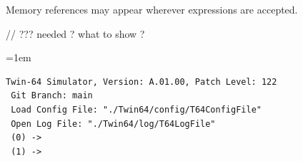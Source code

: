 Memory references may appear wherever expressions are accepted.


// ??? needed ? what to show ?

\begin{list}{}{\leftmargin=1em}
\item
\begin{verbatim}
Twin-64 Simulator, Version: A.01.00, Patch Level: 122
 Git Branch: main
 Load Config File: "./Twin64/config/T64ConfigFile"
 Open Log File: "./Twin64/log/T64LogFile"
 (0) ->
 (1) -> 

\end{verbatim}
\end{list}	
